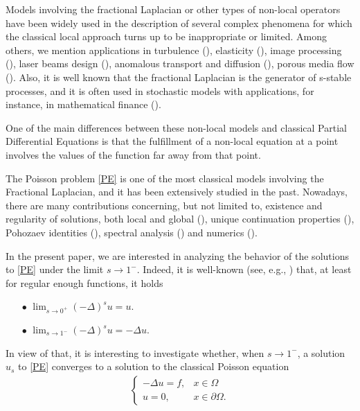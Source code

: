 \documentclass[reqno,twoside]{amsart}
\numberwithin{equation}{section}
\newcommand{\fl}[2]{(-\Delta)^#1#2}
\begin{document}
Models involving the fractional Laplacian or other types of non-local operators have been widely used in the description of several complex phenomena for which the classical local approach turns up to be inappropriate or limited. Among others, we mention applications in turbulence (\cite{bakunin2008turbulence}), elasticity (\cite{dipierro2015dislocation}), image processing (\cite{gilboa2008nonlocal}), laser beams design (\cite{longhi2015fractional}), anomalous transport and diffusion (\cite{meerschaert2012fractional}), porous media flow (\cite{vazquez2012nonlinear}). Also, it is well known that the fractional Laplacian is the generator of s-stable processes, and it is often used in stochastic models with applications, for instance, in mathematical finance (\cite{levendorskii2004pricing}).  

One of the main differences between these non-local models and  classical Partial Differential Equations is  that the fulfillment of a non-local equation  at a point involves the values of the function far away from that point. 

The Poisson problem \eqref{PE} is one of the most classical models involving the Fractional Laplacian, and it has been extensively studied in the past. Nowadays, there are many contributions concerning, but not limited to, existence and regularity of solutions, both local and global (\cite{biccari2017local,cozzi2017interior,grubb2015fractional,
leonori2015basic,ros2016boundary,ros2014dirichlet,servadei2014weak}), unique continuation properties (\cite{fall2014unique}), Pohozaev identities (\cite{ros2014pohozaev}), spectral analysis (\cite{frank2016refined}) and numerics (\cite{acosta2017fractional}).  

In the present paper, we are interested in analyzing the behavior of the solutions to \eqref{PE} under the limit $s\to 1^-$. Indeed, it is well-known (see, e.g., \cite{dihitchhiker,stinga2010extension}) that, at least for regular enough functions, it holds 
\begin{itemize}
	\item[$\bullet$] $\lim_{s\to 0^+}\fl{s}{u} = u$.
	
	\item[$\bullet$] $\lim_{s\to 1^-}\fl{s}{u} = -\Delta u$.
\end{itemize}

In view of that, it is interesting to investigate whether, when $s\to 1^-$, a solution $u_s$ to \eqref{PE} converges to a solution to the classical Poisson equation 
\begin{align}\label{poisson}
	\begin{cases}
	-\Delta u = f, &x\in\Omega\tag{$\mathcal P$}
	\\
	u = 0, & x\in\partial\Omega.
	\end{cases}
\end{align}
\end{document}
